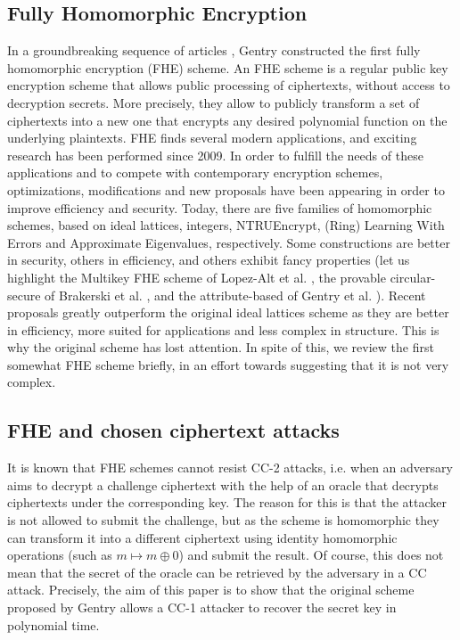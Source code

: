 \documentclass[11pt]{article}
\theoremstyle{plain}
\theoremstyle{definition}
\theoremstyle{remark}
\newcommand{\ie}{i.e.$\!$ }
\newcommand{\etal}{et al.$\!$ }
\begin{document}
\subsection{Fully Homomorphic Encryption}
In a groundbreaking sequence of articles \cite{Gentry:2009:CED:1695738.1695784,Gentry:2009:FHE:1834954,Gentry:2009:FHE:1536414.1536440}, Gentry constructed the first fully homomorphic encryption (FHE) scheme. An FHE scheme is a regular public key encryption scheme that allows public processing of ciphertexts, without access to decryption secrets. More precisely, they allow to publicly transform a set of ciphertexts into a new one that encrypts any desired polynomial function on the underlying plaintexts. FHE finds several modern applications, and exciting research has been performed since 2009. In order to fulfill the needs of these applications and to compete with contemporary encryption schemes, optimizations, modifications and new proposals have been appearing in order to improve efficiency and security. Today, there are five families of homomorphic schemes, based on ideal lattices, integers, NTRUEncrypt, (Ring) Learning With Errors and Approximate Eigenvalues, respectively. Some constructions are better in security, others in efficiency, and others exhibit fancy properties (let us highlight the Multikey FHE scheme of Lopez-Alt \etal \cite{Lopez-alt12on-the-flymultiparty}, the provable circular-secure of Brakerski \etal \cite{Brakerski:2011:FHE:2033036.2033075}, and the attribute-based of Gentry \etal \cite{GSAB13}). Recent proposals greatly outperform the original ideal lattices scheme as they are better in efficiency, more suited for applications and less complex in structure. This is why the original scheme has lost attention. In spite of this, we review the first somewhat FHE scheme briefly, in an effort towards suggesting that it is not very complex. 

\subsection{FHE and chosen ciphertext attacks}
It is known that FHE schemes cannot resist CC-2 attacks, \ie when an adversary aims to decrypt a challenge ciphertext with the help of an oracle that decrypts ciphertexts under the corresponding key. The reason for this is that the attacker is not allowed to submit the challenge, but as the scheme is homomorphic they can transform it into a different ciphertext using identity homomorphic operations (such as $m\mapsto m\oplus 0$) and submit the result. Of course, this does not mean that the secret of the oracle can be retrieved by the adversary in a CC attack. Precisely, the aim of this paper is to show that the original scheme proposed by Gentry allows a CC-1 attacker to recover the secret key in polynomial time.
\end{document}
